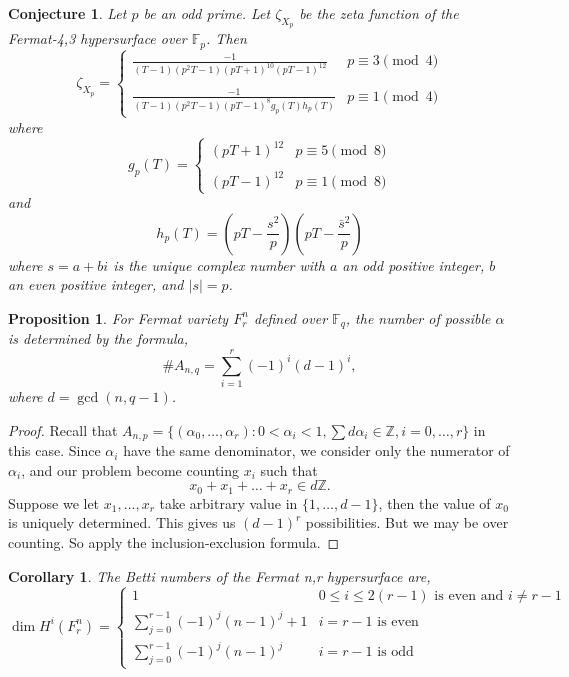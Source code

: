 \documentclass{article}
\newcommand{\Z}{\mathbb{Z}}
\newcommand{\F}{\mathbb{F}}
\newtheorem{corollary}{Corollary}[theorem]
\newtheorem{proposition}[theorem]{Proposition}
\newtheorem{conjecture}[theorem]{Conjecture}
\theoremstyle{definition}
\theoremstyle{definition}
\theoremstyle{remark}
\begin{document}
\begin{conjecture} Let $p$ be an odd prime. Let $\zeta_{X_p}$ be the zeta function of the Fermat-4,3 hypersurface over $\F_p$. Then
\[\zeta_{X_p} = \begin{cases} \frac{-1}{(T-1)(p^2T - 1)(pT + 1)^{10}(pT - 1)^{12}} & p \equiv 3 \pmod 4 \\ & \\
\frac{-1}{(T-1)(p^2T - 1)(pT - 1)^8g_p(T)h_p(T)} & p \equiv 1 \pmod 4\end{cases}\]
where
\[g_p(T) = \begin{cases} (pT + 1)^{12} & p \equiv 5 \pmod 8 \\ & \\ (pT - 1)^{12} & p \equiv 1 \pmod 8\end{cases}\]
and 
\[h_p(T) = \left (pT - \frac{s^2}{p}\right)\left(pT - \frac{\bar{s}^2}{p}\right)\]
where $s = a + bi$ is the unique complex number with $a$ an odd positive integer, $b$ an even positive integer, and $|s| = p$.
\end{conjecture}

\begin{proposition}
For Fermat variety $F^n_r$ defined over $\F_q$, the number of possible $\alpha$ is determined by the formula, \[\# A_{n,q} = \sum_{i = 1}^r (-1)^i(d-1)^i,\] where $d = \gcd(n, q-1)$.
\end{proposition}
\begin{proof}
Recall that $ A_{n, p} = \{ (\alpha_0, \dots, \alpha_r): 0 < \alpha_i < 1, \sum d\alpha_i \in \Z, i = 0, \dots, r\}$ in this case. Since $\alpha_i$ have the same denominator, we consider only the numerator of $\alpha_i$, and our problem become counting $x_i$ such that \[x_0 + x_1 + \dots + x_r \in d\Z.\]
Suppose we let $x_1, \dots, x_r$ take arbitrary value in $\{1, \dots, d-1\}$, then the value of $x_0$ is uniquely determined. This gives us $(d-1)^r$ possibilities. But we may be over counting. So apply the inclusion-exclusion formula.  
\end{proof}

\begin{corollary}
The Betti numbers of the Fermat n,r hypersurface are,
\[ 
\dim H^i(F^n_r) = 
\begin{cases}
1  & 0 \le i \le 2(r-1) \text{ is even and } i \neq r - 1 \\
\sum\limits_{j=0}^{r-1} (-1)^j (n-1)^j + 1 & i = r-1 \text{ is even} \\
\sum\limits_{j=0}^{r-1} (-1)^j (n-1)^j & i = r - 1 \text{ is odd}
\end{cases}
\]
\end{corollary}
\end{document}
